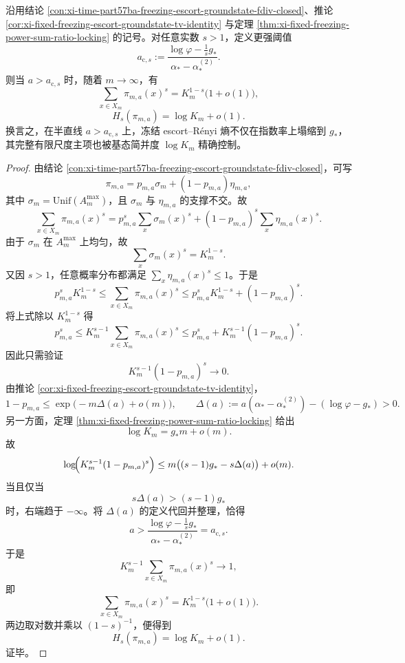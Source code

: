 \begin{theorem}\label{thm:xi-time-part65c-escort-renyi-finite-size-mainterm}
沿用结论 \ref{con:xi-time-part57ba-freezing-escort-groundstate-fdiv-closed}、推论 \ref{cor:xi-fixed-freezing-escort-groundstate-tv-identity} 与定理 \ref{thm:xi-fixed-freezing-power-sum-ratio-locking} 的记号。对任意实数 \(s>1\)，定义更强阈值
\[
a_{\mathrm c,s}:=
\frac{\log\varphi-\frac{1}{s}g_*}{\alpha_*-\alpha_*^{(2)}}.
\]
则当 \(a>a_{\mathrm c,s}\) 时，随着 \(m\to\infty\)，有
\[
\boxed{\;
\sum_{x\in X_m}\pi_{m,a}(x)^s
=
K_m^{1-s}\bigl(1+o(1)\bigr),\;}
\]
\[
\boxed{\;
H_s(\pi_{m,a})=\log K_m+o(1).\;}
\]
换言之，在半直线 \(a>a_{\mathrm c,s}\) 上，冻结 escort--Rényi 熵不仅在指数率上塌缩到 \(g_*\)，其完整有限尺度主项也被基态简并度 \(\log K_m\) 精确控制。
\end{theorem}
\begin{proof}
由结论 \ref{con:xi-time-part57ba-freezing-escort-groundstate-fdiv-closed}，可写
\[
\pi_{m,a}=p_{m,a}\sigma_m+(1-p_{m,a})\eta_{m,a},
\]
其中 \(\sigma_m=\mathrm{Unif}(A_m^{\max})\)，且 \(\sigma_m\) 与 \(\eta_{m,a}\) 的支撑不交。故
\[
\sum_{x\in X_m}\pi_{m,a}(x)^s
=
p_{m,a}^s\sum_x \sigma_m(x)^s
+(1-p_{m,a})^s\sum_x \eta_{m,a}(x)^s.
\]
由于 \(\sigma_m\) 在 \(A_m^{\max}\) 上均匀，故
\[
\sum_x \sigma_m(x)^s=K_m^{1-s}.
\]
又因 \(s>1\)，任意概率分布都满足 \(\sum_x \eta_{m,a}(x)^s\le 1\)。于是
\[
p_{m,a}^sK_m^{1-s}
\le
\sum_{x\in X_m}\pi_{m,a}(x)^s
\le
p_{m,a}^sK_m^{1-s}+(1-p_{m,a})^s.
\]
将上式除以 \(K_m^{1-s}\) 得
\[
p_{m,a}^s
\le
K_m^{s-1}\sum_{x\in X_m}\pi_{m,a}(x)^s
\le
p_{m,a}^s+K_m^{s-1}(1-p_{m,a})^s.
\]
因此只需验证
\[
K_m^{s-1}(1-p_{m,a})^s\to 0.
\]
由推论 \ref{cor:xi-fixed-freezing-escort-groundstate-tv-identity}，
\[
1-p_{m,a}\le \exp\!\bigl(-m\Delta(a)+o(m)\bigr),
\qquad
\Delta(a):=a(\alpha_*-\alpha_*^{(2)})-(\log\varphi-g_*)>0.
\]
另一方面，定理 \ref{thm:xi-fixed-freezing-power-sum-ratio-locking} 给出
\[
\log K_m=g_*m+o(m).
\]
故
\[
\log\!\Bigl(K_m^{s-1}(1-p_{m,a})^s\Bigr)
\le
m\bigl((s-1)g_*-s\Delta(a)\bigr)+o(m).
\]
当且仅当
\[
s\Delta(a)>(s-1)g_*
\]
时，右端趋于 \(-\infty\)。将 \(\Delta(a)\) 的定义代回并整理，恰得
\[
a>\frac{\log\varphi-\frac{1}{s}g_*}{\alpha_*-\alpha_*^{(2)}}=a_{\mathrm c,s}.
\]
于是
\[
K_m^{s-1}\sum_{x\in X_m}\pi_{m,a}(x)^s\to 1,
\]
即
\[
\sum_{x\in X_m}\pi_{m,a}(x)^s
=
K_m^{1-s}\bigl(1+o(1)\bigr).
\]
两边取对数并乘以 \((1-s)^{-1}\)，便得到
\[
H_s(\pi_{m,a})=\log K_m+o(1).
\]
证毕。
\end{proof}

